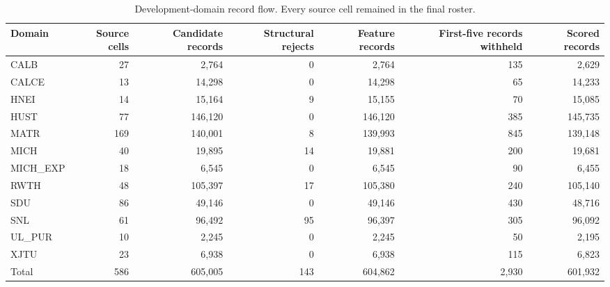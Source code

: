 \documentclass[11pt]{article}
\begin{document}
\begin{landscape}
\begin{table}[H]
\centering
\caption{Development-domain record flow. Every source cell remained in the final roster.}
\label{tab:development_flow}
\scriptsize
\setlength{\tabcolsep}{5.2pt}
\renewcommand{\arraystretch}{1.05}
\begin{tabular}{@{}lrrrrrr@{}}
\toprule
Domain & Source cells & Candidate records & Structural rejects & Feature records & First-five records withheld & Scored records \\
\midrule
CALB & 27 & 2,764 & 0 & 2,764 & 135 & 2,629 \\
CALCE & 13 & 14,298 & 0 & 14,298 & 65 & 14,233 \\
HNEI & 14 & 15,164 & 9 & 15,155 & 70 & 15,085 \\
HUST & 77 & 146,120 & 0 & 146,120 & 385 & 145,735 \\
MATR & 169 & 140,001 & 8 & 139,993 & 845 & 139,148 \\
MICH & 40 & 19,895 & 14 & 19,881 & 200 & 19,681 \\
MICH\_EXP & 18 & 6,545 & 0 & 6,545 & 90 & 6,455 \\
RWTH & 48 & 105,397 & 17 & 105,380 & 240 & 105,140 \\
SDU & 86 & 49,146 & 0 & 49,146 & 430 & 48,716 \\
SNL & 61 & 96,492 & 95 & 96,397 & 305 & 96,092 \\
UL\_PUR & 10 & 2,245 & 0 & 2,245 & 50 & 2,195 \\
XJTU & 23 & 6,938 & 0 & 6,938 & 115 & 6,823 \\
\midrule
Total & 586 & 605,005 & 143 & 604,862 & 2,930 & 601,932 \\
\bottomrule
\end{tabular}
\end{table}


\end{landscape}
\end{document}
